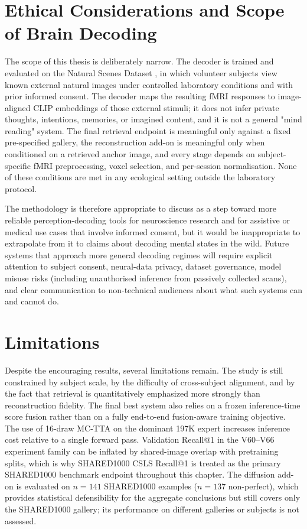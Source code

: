 \section{Ethical Considerations and Scope of Brain Decoding}
\label{sec:ethics}

The scope of this thesis is deliberately narrow. The decoder is trained and evaluated on the Natural Scenes Dataset \cite{Allen2022}, in which volunteer subjects view known external natural images under controlled laboratory conditions and with prior informed consent. The decoder maps the resulting fMRI responses to image-aligned CLIP embeddings of those external stimuli; it does not infer private thoughts, intentions, memories, or imagined content, and it is not a general "mind reading" system. The final retrieval endpoint is meaningful only against a fixed pre-specified gallery, the reconstruction add-on is meaningful only when conditioned on a retrieved anchor image, and every stage depends on subject-specific fMRI preprocessing, voxel selection, and per-session normalisation. None of these conditions are met in any ecological setting outside the laboratory protocol.

The methodology is therefore appropriate to discuss as a step toward more reliable perception-decoding tools for neuroscience research and for assistive or medical use cases that involve informed consent, but it would be inappropriate to extrapolate from it to claims about decoding mental states in the wild. Future systems that approach more general decoding regimes will require explicit attention to subject consent, neural-data privacy, dataset governance, model misuse risks (including unauthorised inference from passively collected scans), and clear communication to non-technical audiences about what such systems can and cannot do.

\section{Limitations}

Despite the encouraging results, several limitations remain. The study is still constrained by subject scale, by the difficulty of cross-subject alignment, and by the fact that retrieval is quantitatively emphasized more strongly than reconstruction fidelity. The final best system also relies on a frozen inference-time score fusion rather than on a fully end-to-end fusion-aware training objective. The use of 16-draw MC-TTA on the dominant 197K expert increases inference cost relative to a single forward pass. Validation Recall@1 in the V60--V66 experiment family can be inflated by shared-image overlap with pretraining splits, which is why SHARED1000 CSLS Recall@1 is treated as the primary SHARED1000 benchmark endpoint throughout this chapter. The diffusion add-on is evaluated on $n{=}141$ SHARED1000 examples ($n{=}137$ non-perfect), which provides statistical defensibility for the aggregate conclusions but still covers only the SHARED1000 gallery; its performance on different galleries or subjects is not assessed.

